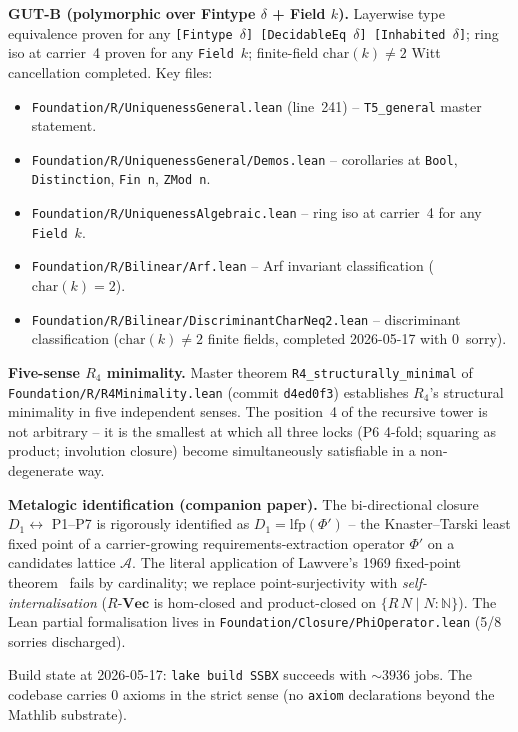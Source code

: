 \documentclass[11pt,a4paper]{article}
\theoremstyle{plain}
\theoremstyle{definition}
\theoremstyle{remark}
\newcommand{\N}{\mathbb{N}}
\newcommand{\cat}[1]{\mathbf{#1}}
\newcommand{\lfp}{\mathrm{lfp}}
\begin{document}
\textbf{GUT-B (polymorphic over Fintype $\delta$ + Field $k$).} Layerwise type equivalence proven for any \texttt{[Fintype $\delta$] [DecidableEq $\delta$] [Inhabited $\delta$]}; ring iso at carrier~4 proven for any \texttt{Field}~$k$; finite-field $\mathrm{char}(k) \neq 2$ Witt cancellation completed. Key files:

\begin{itemize}[leftmargin=*]
\item \texttt{Foundation/R/UniquenessGeneral.lean} (line~241) -- \texttt{T5\_general} master statement.
\item \texttt{Foundation/R/UniquenessGeneral/Demos.lean} -- corollaries at \texttt{Bool}, \texttt{Distinction}, \texttt{Fin n}, \texttt{ZMod n}.
\item \texttt{Foundation/R/UniquenessAlgebraic.lean} -- ring iso at carrier~4 for any \texttt{Field}~$k$.
\item \texttt{Foundation/R/Bilinear/Arf.lean} -- Arf invariant classification ($\mathrm{char}(k) = 2$).
\item \texttt{Foundation/R/Bilinear/DiscriminantCharNeq2.lean} -- discriminant classification ($\mathrm{char}(k) \neq 2$ finite fields, completed 2026-05-17 with 0~sorry).
\end{itemize}

\textbf{Five-sense $R_4$ minimality.} Master theorem \texttt{R4\_structurally\_minimal} of \texttt{Foundation/R/R4Minimality.lean} (commit \texttt{d4ed0f3}) establishes $R_4$'s structural minimality in five independent senses. The position~4 of the recursive tower is not arbitrary -- it is the smallest at which all three locks (P6 4-fold; squaring as product; involution closure) become simultaneously satisfiable in a non-degenerate way.

\textbf{Metalogic identification (companion paper).} The bi-directional closure $D_1 \longleftrightarrow$ P1--P7 is rigorously identified as $D_1 = \lfp(\Phi')$ -- the Knaster--Tarski least fixed point of a carrier-growing requirements-extraction operator $\Phi'$ on a candidates lattice $\mathcal{A}$. The literal application of Lawvere's 1969 fixed-point theorem~\cite{Law69} fails by cardinality; we replace point-surjectivity with \emph{self-internalisation} ($R$-$\cat{Vec}$ is hom-closed and product-closed on $\{R\,N \mid N : \N\}$). The Lean partial formalisation lives in \texttt{Foundation/Closure/PhiOperator.lean} (5/8 sorries discharged).

Build state at 2026-05-17: \texttt{lake build SSBX} succeeds with ${\sim}3936$ jobs. The codebase carries 0 axioms in the strict sense (no \texttt{axiom} declarations beyond the Mathlib substrate).
\end{document}
